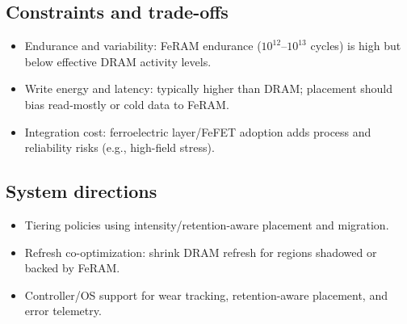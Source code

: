 \subsection*{Constraints and trade-offs}
\begin{itemize}
  \item Endurance and variability: FeRAM endurance ($10^{12}$--$10^{13}$ cycles) is high but below effective DRAM activity levels.
  \item Write energy and latency: typically higher than DRAM; placement should bias read-mostly or cold data to FeRAM.
  \item Integration cost: ferroelectric layer/FeFET adoption adds process and reliability risks (e.g., high-field stress).
\end{itemize}

\subsection*{System directions}
\begin{itemize}
  \item Tiering policies using intensity/retention-aware placement and migration.
  \item Refresh co-optimization: shrink DRAM refresh for regions shadowed or backed by FeRAM.
  \item Controller/OS support for wear tracking, retention-aware placement, and error telemetry.
\end{itemize}
